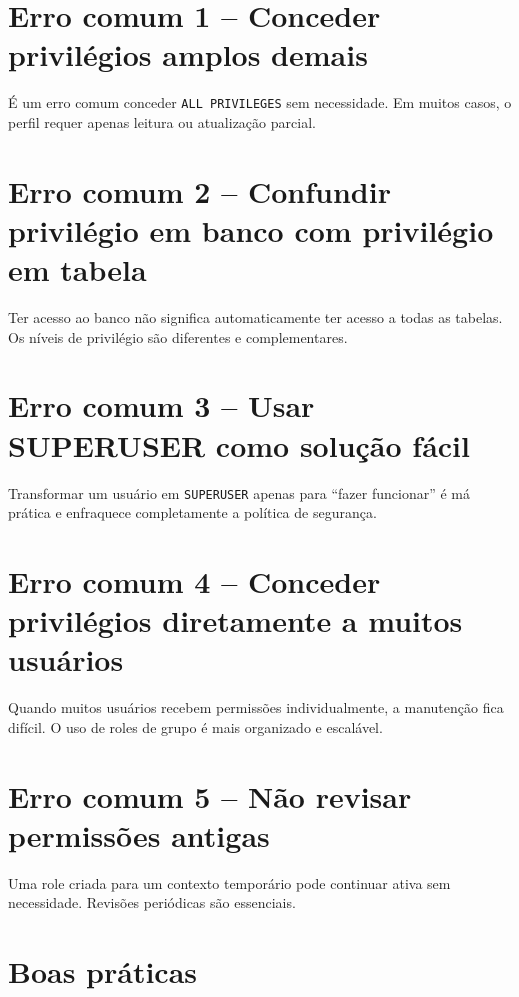 \section{Erro comum 1 -- Conceder privilégios amplos demais}

É um erro comum conceder \texttt{ALL PRIVILEGES} sem necessidade. Em muitos casos, o perfil requer apenas leitura ou atualização parcial.

\section{Erro comum 2 -- Confundir privilégio em banco com privilégio em tabela}

Ter acesso ao banco não significa automaticamente ter acesso a todas as tabelas. Os níveis de privilégio são diferentes e complementares.

\section{Erro comum 3 -- Usar SUPERUSER como solução fácil}

Transformar um usuário em \texttt{SUPERUSER} apenas para “fazer funcionar” é má prática e enfraquece completamente a política de segurança.

\section{Erro comum 4 -- Conceder privilégios diretamente a muitos usuários}

Quando muitos usuários recebem permissões individualmente, a manutenção fica difícil. O uso de roles de grupo é mais organizado e escalável.

\section{Erro comum 5 -- Não revisar permissões antigas}

Uma role criada para um contexto temporário pode continuar ativa sem necessidade. Revisões periódicas são essenciais.

\section{Boas práticas}

